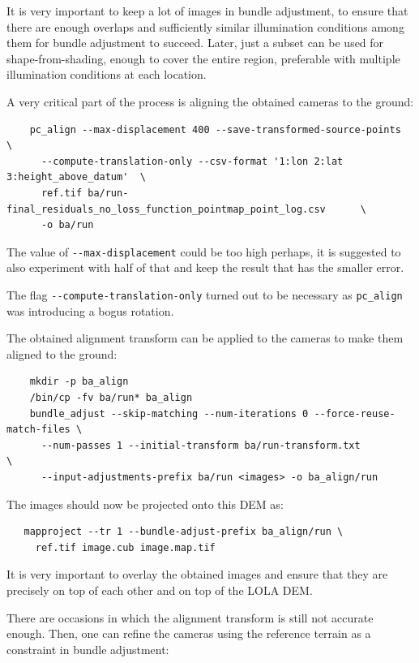 It is very important to keep a lot of images in bundle adjustment, to ensure
that there are enough overlaps and sufficiently similar illumination conditions
among them for bundle adjustment to succeed. Later, just a subset can be used
for shape-from-shading, enough to cover the entire region, preferable with
multiple illumination conditions at each location. 

A very critical part of the process is aligning the obtained cameras to the ground:

\begin{verbatim}
    pc_align --max-displacement 400 --save-transformed-source-points              \
      --compute-translation-only --csv-format '1:lon 2:lat 3:height_above_datum'  \
      ref.tif ba/run-final_residuals_no_loss_function_pointmap_point_log.csv      \
      -o ba/run 
\end{verbatim}

The value of \texttt{-\/-max-displacement} could be too high perhaps, it
is suggested to also experiment with half of that and keep the result
that has the smaller error.

The flag \texttt{-\/-compute-translation-only} turned out to be
necessary as \texttt{pc\_align} was introducing a bogus rotation. 

The obtained alignment transform can be applied to the cameras to make them aligned
to the ground:

\begin{verbatim}
    mkdir -p ba_align
    /bin/cp -fv ba/run* ba_align
    bundle_adjust --skip-matching --num-iterations 0 --force-reuse-match-files \
      --num-passes 1 --initial-transform ba/run-transform.txt                  \
      --input-adjustments-prefix ba/run <images> -o ba_align/run
\end{verbatim}

The images should now be projected onto this DEM as:

\begin{verbatim}
   mapproject --tr 1 --bundle-adjust-prefix ba_align/run \
     ref.tif image.cub image.map.tif
\end{verbatim}

It is very important to overlay the obtained images and ensure that they
are precisely on top of each other and on top of the LOLA DEM. 

There are occasions in which the alignment transform is still not accurate
enough. Then, one can refine the cameras using the reference terrain as
a constraint in bundle adjustment:


